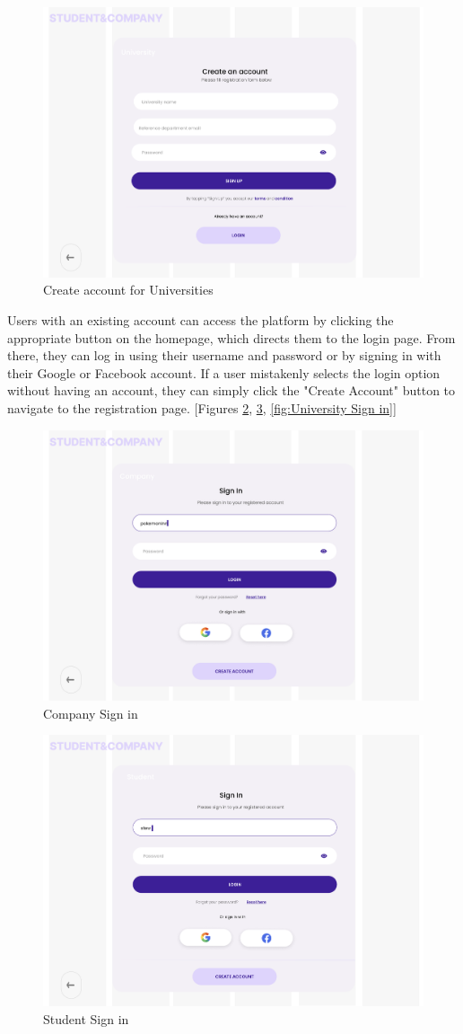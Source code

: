 \begin{figure} [H]
    \centering
    \includegraphics[width=0.5\linewidth]{Interface Images/log in sing up/Screenshot 2024-12-12 045042.png}
    \caption{Create account for Universities}
    \label{fig:Create account for Universities}
\end{figure}

Users with an existing account can access the platform by clicking the appropriate button on the homepage, which directs them to the login page. From there, they can log in using their username and password or by signing in with their Google or Facebook account. If a user mistakenly selects the login option without having an account, they can simply click the "Create Account" button to navigate to the registration page. [Figures \ref{fig:Company Sign in}, \ref{fig: Student Sign in}, \ref{fig:University Sign in}]

\begin{figure} [H]
    \centering
    \includegraphics[width=0.5\linewidth]{Interface Images/log in sing up/Screenshot 2024-12-12 045111.png}
    \caption{Company Sign in}
    \label{fig:Company Sign in}
\end{figure}

\begin{figure} [H]
    \centering
    \includegraphics[width=0.5\linewidth]{Interface Images/log in sing up/Screenshot 2024-12-12 045127.png}
    \caption{Student Sign in}
    \label{fig: Student Sign in}
\end{figure}

